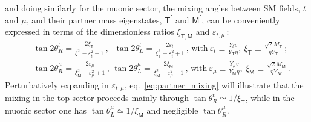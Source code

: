 and doing similarly for the muonic sector, the mixing angles between SM fields, $t$ and $\mu$,  and their partner mass eigenstates, $\mathsf{T}^{\prime}$ and $\mathsf{M}^{\prime}$, can be conveniently expressed in terms of the dimensionless ratios $\xi_{\mathsf{T,M}}$ and $\varepsilon_{t,\mu}\, $:
\begin{eqnarray}
	\label{eq:partner_mixing}
	& \  \tan 2 \theta_{R}^{t} = \frac{2 \xi_{\mathsf{T}}}{\xi_{\mathsf{T}}^2-\varepsilon_{t}^2-1} \, , \, 
	\ \, \tan 2 \theta_{L}^{t} = \frac{2 \varepsilon_{t}}{\xi_{\mathsf{T}}^2-\varepsilon_{t}^2 +1} \, , \,   \textrm{with} \ \varepsilon_{t} \equiv \frac{Y_{t} v}{Y_{\mathsf{T}} \eta},~\xi_{\mathsf{T}} \equiv \frac{\sqrt{2} M_{\mathsf{T}}}{\eta Y_{\mathsf{T}}} \, ; \ \\
	& \  \tan 2 \theta_{R}^{\mu} = \frac{2 \varepsilon_{\mu}}{\xi_{\mathsf{M}}^2-\varepsilon_{\mu}^2+1} \, , \, 
	\tan 2 \theta_{L}^{\mu} = \frac{2 \xi_{\mathsf{M}}}
	{\xi_{\mathsf{M}}^2-\varepsilon_{\mu}^2 -1}  \, , \, 
	\textrm{with} \ \varepsilon_{\mu} \equiv \frac{Y_{\mu} v}{Y_{\mathsf{M}} \eta},~\xi_{\mathsf{M}} \equiv \frac{\sqrt{2} M_{\mathsf{M}}}{\eta Y_{\mathcal{M}}} \, .
	\nonumber
\end{eqnarray}
Perturbatively expanding in $\varepsilon_{t,\mu}$, eq.~\eqref{eq:partner_mixing} will illustrate that the mixing in the top sector proceeds mainly through $\tan\theta^{t}_{R} \simeq 1/\xi_{\mathsf{T}}$, while in the muonic sector one has  $\tan\theta^{\mu}_{L} \simeq 1/\xi_{\mathsf{M}}$ and negligible $\tan\theta^{\mu}_{R}$.

